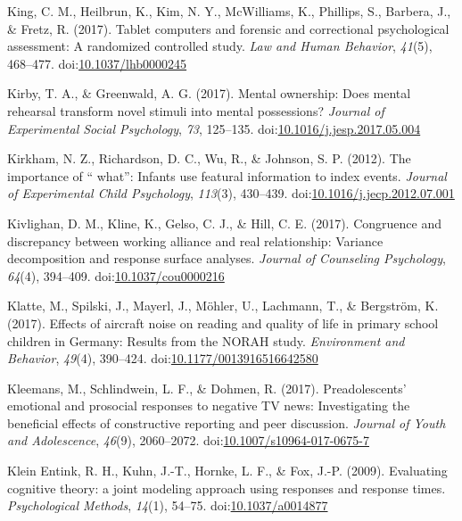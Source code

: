 \documentclass[english,man]{apa6}
\theoremstyle{definition}
\theoremstyle{definition}
\theoremstyle{definition}
\theoremstyle{remark}
\begin{document}
\hypertarget{ref-King2017a}{}
King, C. M., Heilbrun, K., Kim, N. Y., McWilliams, K., Phillips, S.,
Barbera, J., \& Fretz, R. (2017). Tablet computers and forensic and
correctional psychological assessment: A randomized controlled study.
\emph{Law and Human Behavior}, \emph{41}(5), 468--477.
doi:\href{https://doi.org/10.1037/lhb0000245}{10.1037/lhb0000245}

\hypertarget{ref-Kirby2017}{}
Kirby, T. A., \& Greenwald, A. G. (2017). Mental ownership: Does mental
rehearsal transform novel stimuli into mental possessions? \emph{Journal
of Experimental Social Psychology}, \emph{73}, 125--135.
doi:\href{https://doi.org/10.1016/j.jesp.2017.05.004}{10.1016/j.jesp.2017.05.004}

\hypertarget{ref-Kirkham2012}{}
Kirkham, N. Z., Richardson, D. C., Wu, R., \& Johnson, S. P. (2012). The
importance of `` what'': Infants use featural information to index
events. \emph{Journal of Experimental Child Psychology}, \emph{113}(3),
430--439.
doi:\href{https://doi.org/10.1016/j.jecp.2012.07.001}{10.1016/j.jecp.2012.07.001}

\hypertarget{ref-Kivlighan2017}{}
Kivlighan, D. M., Kline, K., Gelso, C. J., \& Hill, C. E. (2017).
Congruence and discrepancy between working alliance and real
relationship: Variance decomposition and response surface analyses.
\emph{Journal of Counseling Psychology}, \emph{64}(4), 394--409.
doi:\href{https://doi.org/10.1037/cou0000216}{10.1037/cou0000216}

\hypertarget{ref-Klatte2017}{}
Klatte, M., Spilski, J., Mayerl, J., Möhler, U., Lachmann, T., \&
Bergström, K. (2017). Effects of aircraft noise on reading and quality
of life in primary school children in Germany: Results from the NORAH
study. \emph{Environment and Behavior}, \emph{49}(4), 390--424.
doi:\href{https://doi.org/10.1177/0013916516642580}{10.1177/0013916516642580}

\hypertarget{ref-Kleemans2017}{}
Kleemans, M., Schlindwein, L. F., \& Dohmen, R. (2017). Preadolescents'
emotional and prosocial responses to negative TV news: Investigating the
beneficial effects of constructive reporting and peer discussion.
\emph{Journal of Youth and Adolescence}, \emph{46}(9), 2060--2072.
doi:\href{https://doi.org/10.1007/s10964-017-0675-7}{10.1007/s10964-017-0675-7}

\hypertarget{ref-KleinEntink2009}{}
Klein Entink, R. H., Kuhn, J.-T., Hornke, L. F., \& Fox, J.-P. (2009).
Evaluating cognitive theory: a joint modeling approach using responses
and response times. \emph{Psychological Methods}, \emph{14}(1), 54--75.
doi:\href{https://doi.org/10.1037/a0014877}{10.1037/a0014877}
\end{document}
